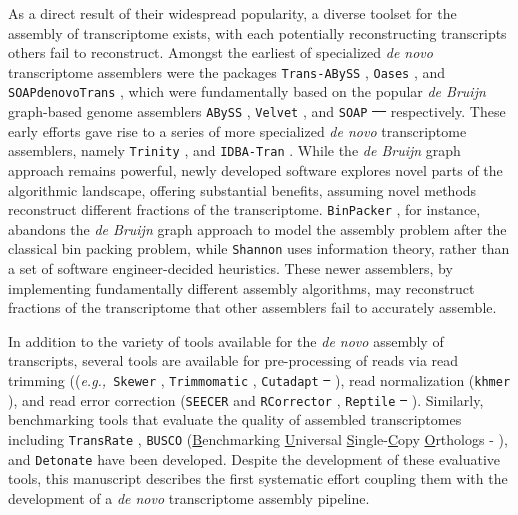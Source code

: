 \documentclass[10pt,letterpaper]{article}
\newcommand{\tit}{\textit}
\newcommand{\eg}{\textit{e.g.,}}
\providecommand{\DIFaddtex}[1]{{\protect\color{blue}\uwave{#1}}} %
\providecommand{\DIFdeltex}[1]{{\protect\color{red}\sout{#1}}}                      %
\providecommand{\DIFaddbegin}{} %
\providecommand{\DIFaddend}{} %
\providecommand{\DIFdelbegin}{} %
\providecommand{\DIFdelend}{} %
\providecommand{\DIFadd}[1]{\texorpdfstring{\DIFaddtex{#1}}{#1}} %
\providecommand{\DIFdel}[1]{\texorpdfstring{\DIFdeltex{#1}}{}} %
\newcommand{\DIFscaledelfig}{0.5}
\newlength{\DIFdelgraphicswidth} %
\newlength{\DIFdelgraphicsheight} %
\newcommand{\DIFaddincludegraphics}[2][]{{\color{blue}\fbox{\DIFOincludegraphics[#1]{#2}}}} %
\newcommand{\DIFdelincludegraphics}[2][]{%
\sbox{\DIFdelgraphicsbox}{\DIFOincludegraphics[#1]{#2}}%
\settoboxwidth{\DIFdelgraphicswidth}{\DIFdelgraphicsbox} %
\settoboxtotalheight{\DIFdelgraphicsheight}{\DIFdelgraphicsbox} %
\scalebox{\DIFscaledelfig}{%
\parbox[b]{\DIFdelgraphicswidth}{\usebox{\DIFdelgraphicsbox}\\[-\baselineskip] \rule{\DIFdelgraphicswidth}{0em}}\llap{\resizebox{\DIFdelgraphicswidth}{\DIFdelgraphicsheight}{%
\setlength{\unitlength}{\DIFdelgraphicswidth}%
\begin{picture}(1,1)%
\thicklines\linethickness{2pt} %
{\color[rgb]{1,0,0}\put(0,0){\framebox(1,1){}}}%
{\color[rgb]{1,0,0}\put(0,0){\line( 1,1){1}}}%
{\color[rgb]{1,0,0}\put(0,1){\line(1,-1){1}}}%
\end{picture}%
}\hspace*{3pt}}} %
} %
\DeclareRobustCommand{\DIFaddbegin}{\DIFOaddbegin \let\includegraphics\DIFaddincludegraphics} %
\DeclareRobustCommand{\DIFaddend}{\DIFOaddend \let\includegraphics\DIFOincludegraphics} %
\DeclareRobustCommand{\DIFdelbegin}{\DIFOdelbegin \let\includegraphics\DIFdelincludegraphics} %
\DeclareRobustCommand{\DIFdelend}{\DIFOaddend \let\includegraphics\DIFOincludegraphics} %
\begin{document}
As a direct result of their widespread popularity, a diverse toolset for the assembly of transcriptome exists, with each potentially reconstructing transcripts others fail to reconstruct. Amongst the earliest of specialized \tit{de novo} transcriptome assemblers were the packages \texttt{Trans-ABySS} \citep{Robertson:2010ih}, \texttt{Oases} \citep{Schulz:2012je}, and \texttt{SOAPdenovoTrans} \citep{Xie:2013wu}, which were fundamentally based on the popular \tit{de Bruijn} graph-based genome assemblers \texttt{ABySS} \citep{Simpson:2009iv}, \texttt{Velvet} \citep{Zerbino:2008bm}, and \texttt{SOAP} \DIFdelbegin \DIFdel{\mbox{%
\cite{Li:2008in} }%
}\DIFdelend \DIFaddbegin \DIFadd{\mbox{%
\citep{Li:2008in} }%
}\DIFaddend respectively. These early efforts gave rise to a series of more specialized \tit{de novo} transcriptome assemblers, namely \texttt{Trinity} \citep{Haas:2013jq}, and \texttt{IDBA-Tran} \citep{Peng:2013eu}. While the \tit{de Bruijn} graph approach remains powerful, newly developed software explores novel parts of the algorithmic landscape, offering substantial benefits, assuming novel methods reconstruct different fractions of the transcriptome. \texttt{BinPacker} \citep{Liu:2016hh}, for instance, abandons the \tit{de Bruijn} graph approach to model the assembly problem after the classical bin packing problem, while \texttt{Shannon} \citep{Kannan:2016be} uses information theory, rather than a set of software engineer-decided heuristics. These newer assemblers, by implementing fundamentally different assembly algorithms, may reconstruct  fractions of the transcriptome that other assemblers fail to accurately assemble. 

In addition to the variety of tools available for the \tit{de novo} assembly of transcripts, several tools are available for pre-processing of reads via read trimming ((\eg\ \texttt{Skewer} \citep{Jiang:2014cx}, \texttt{Trimmomatic} \citep{Bolger:2014ek}, \texttt{Cutadapt} \DIFdelbegin \DIFdel{\mbox{%
\cite{Martin:2011va}}%
}\DIFdelend \DIFaddbegin \DIFadd{\mbox{%
\citep{Martin:2011va}}%
}\DIFaddend ), read normalization (\texttt{khmer} \citep{Pell:2012id}), and read error correction (\texttt{SEECER} \citep{Le:2013dy} and \texttt{RCorrector} \citep{Song:2015in}, \texttt{Reptile} \DIFdelbegin \DIFdel{\mbox{%
\cite{Yang:2010kv}}%
}\DIFdelend \DIFaddbegin \DIFadd{\mbox{%
\citep{Yang:2010kv}}%
}\DIFaddend ). Similarly, benchmarking tools that evaluate the quality of assembled transcriptomes including \texttt{TransRate} \citep{SmithUnna:2016go}, \texttt{BUSCO} (\underline{B}enchmarking \underline{U}niversal \underline{S}ingle-\underline{C}opy \underline{O}rthologs - \citep{Simao:2015kk}), and \texttt{Detonate} \citep{Li:2014cm} have been developed. Despite the development of these evaluative tools, this manuscript describes the first systematic effort coupling them with the development of a \textit{de novo} transcriptome assembly pipeline.
\end{document}
